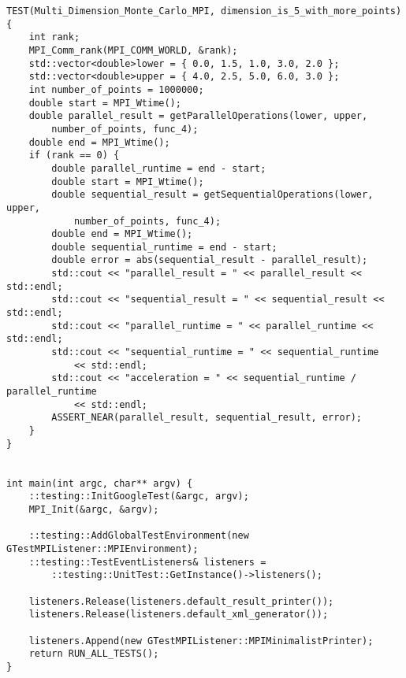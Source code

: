 \documentclass{report}
\begin{document}
\begin{lstlisting}
TEST(Multi_Dimension_Monte_Carlo_MPI, dimension_is_5_with_more_points) {
    int rank;
    MPI_Comm_rank(MPI_COMM_WORLD, &rank);
    std::vector<double>lower = { 0.0, 1.5, 1.0, 3.0, 2.0 };
    std::vector<double>upper = { 4.0, 2.5, 5.0, 6.0, 3.0 };
    int number_of_points = 1000000;
    double start = MPI_Wtime();
    double parallel_result = getParallelOperations(lower, upper,
        number_of_points, func_4);
    double end = MPI_Wtime();
    if (rank == 0) {
        double parallel_runtime = end - start;
        double start = MPI_Wtime();
        double sequential_result = getSequentialOperations(lower, upper,
            number_of_points, func_4);
        double end = MPI_Wtime();
        double sequential_runtime = end - start;
        double error = abs(sequential_result - parallel_result);
        std::cout << "parallel_result = " << parallel_result << std::endl;
        std::cout << "sequential_result = " << sequential_result << std::endl;
        std::cout << "parallel_runtime = " << parallel_runtime << std::endl;
        std::cout << "sequential_runtime = " << sequential_runtime
            << std::endl;
        std::cout << "acceleration = " << sequential_runtime / parallel_runtime
            << std::endl;
        ASSERT_NEAR(parallel_result, sequential_result, error);
    }
}


int main(int argc, char** argv) {
    ::testing::InitGoogleTest(&argc, argv);
    MPI_Init(&argc, &argv);

    ::testing::AddGlobalTestEnvironment(new GTestMPIListener::MPIEnvironment);
    ::testing::TestEventListeners& listeners =
        ::testing::UnitTest::GetInstance()->listeners();

    listeners.Release(listeners.default_result_printer());
    listeners.Release(listeners.default_xml_generator());

    listeners.Append(new GTestMPIListener::MPIMinimalistPrinter);
    return RUN_ALL_TESTS();
}
\end{lstlisting}
\end{document}
